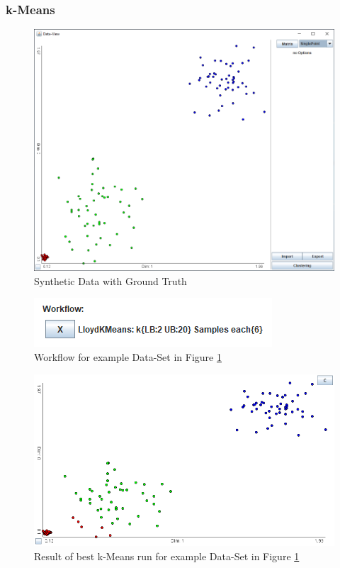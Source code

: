 \documentclass[
	a4paper,
	english,
	twoside,
	openright,               
	11pt                            
	]{report}
\begin{document}
\subsubsection{k-Means}
\begin{figure}[h]
	\centering
	\includegraphics[scale=.4]{better_base}
	\caption{Synthetic Data with Ground Truth}
	\label{fig:better_base}
\end{figure}
\begin{figure}[h]
	\centering
	\includegraphics[scale=.75]{better_base_wf}
	\caption{Workflow for example Data-Set in Figure \ref{fig:better_base}}
	\label{fig:better_base_wf}
\end{figure}
\begin{figure}[h]
	\centering
	\includegraphics[scale=.4]{better_base_best}
	\caption{Result of best k-Means run for example Data-Set in Figure \ref{fig:better_base}}
	\label{fig:better_base_best}
\end{figure}
\end{document}
